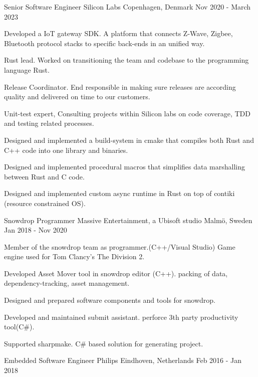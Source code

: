 \begin{cventries}
  \cventry
    {Senior Software Engineer}
    {Silicon Labs}
    {Copenhagen, Denmark}
    {Nov 2020 - March 2023}
    {
      \begin{cvitems}
		\item {Developed a IoT gateway SDK. A platform that connects Z-Wave, Zigbee, Bluetooth protocol stacks to specific back-ends in an unified way.}
		\item {Rust lead. Worked on transitioning the team and codebase to the programming language Rust.}
		\item {Release Coordinator. End responsible in making sure releases are according quality and delivered on time to our customers.}
		\item {Unit-test expert, Consulting projects within Silicon labs on code coverage, TDD and testing related processes.}
		\item {Designed and implemented a build-system in cmake that compiles both Rust and C++ code into one library and binaries.}
		\item {Designed and implemented procedural macros that simplifies data marshalling between Rust and C code.}
		\item {Designed and implemented custom async runtime in Rust on top of contiki (resource constrained OS). }
      \end{cvitems}
    }
  \cventry
    {Snowdrop Programmer}
    {Massive Entertainment, a Ubisoft studio}
    {Malmö, Sweden}
    {Jan 2018 - Nov 2020}
    {
      \begin{cvitems}
		\item { Member of the snowdrop team as programmer.(C++/Visual Studio) Game engine used for Tom Clancy's The Division 2. }
        \item { Developed Asset Mover tool in snowdrop editor (C++). packing of data, dependency-tracking, asset management.}
		\item { Designed and prepared software components and tools for snowdrop. }
        \item { Developed and maintained submit assistant. perforce 3th party productivity tool(C\#). }
        \item { Supported sharpmake. C\# based solution for generating project. }
      \end{cvitems}
    }
  \cventry
    {Embedded Software Engineer}
    {Philips}
    {Eindhoven, Netherlands}
    {Feb 2016 - Jan 2018}
    {
      \begin{cvitems}

\end{cvitems}}
\end{cventries}

